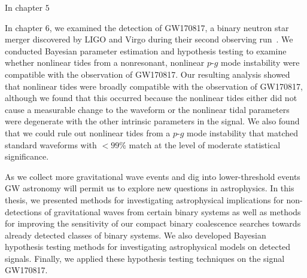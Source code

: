 In chapter $5$

In chapter $6$, we examined the detection of GW170817, a binary neutron star merger discovered by LIGO and Virgo during their second observing run~\cite{TheLIGOScientific:2017qsa}. We conducted Bayesian parameter estimation and hypothesis testing to examine whether nonlinear tides from a nonresonant, nonlinear $p$-$g$ mode instability were compatible with the observation of GW170817. Our resulting analysis showed that nonlinear tides were broadly compatible with the observation of GW170817, although we found that this occurred because the nonlinear tides either did not cause a measurable change to the waveform or the nonlinear tidal parameters were degenerate with the other intrinsic parameters in the signal. We also found that we could rule out nonlinear tides from a $p$-$g$ mode instability that matched standard waveforms with $< 99 \%$ match at the level of moderate statistical significance.

As we collect more gravitational wave events and dig into lower-threshold events GW astronomy will permit us to explore new questions in astrophysics. In this thesis, we presented methods for investigating astrophysical implications for non-detections of gravitational waves from certain binary systems as well as methods for improving the sensitivity of our compact binary coalescence searches towards already detected classes of binary systems. We also developed Bayesian hypothesis testing methods for investigating astrophysical models on detected signals. Finally, we applied these hypothesis testing techniques on the signal GW170817.
